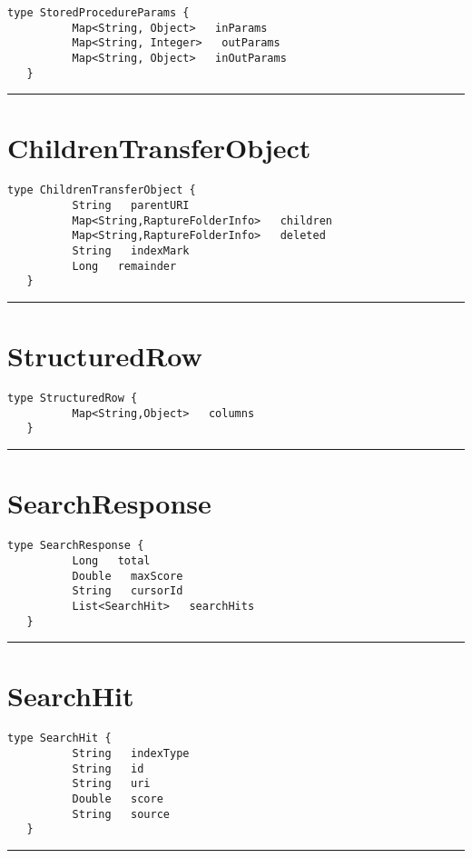 \begin{lstlisting}[style=nonumbers]
   type StoredProcedureParams {
          Map<String, Object>   inParams
          Map<String, Integer>   outParams
          Map<String, Object>   inOutParams
   }
\end{lstlisting}

\rule{12cm}{2pt}
\section{ChildrenTransferObject}
\label{type:ChildrenTransferObject}

\begin{lstlisting}[style=nonumbers]
   type ChildrenTransferObject {
          String   parentURI
          Map<String,RaptureFolderInfo>   children
          Map<String,RaptureFolderInfo>   deleted
          String   indexMark
          Long   remainder
   }
\end{lstlisting}

\rule{12cm}{2pt}
\section{StructuredRow}
\label{type:StructuredRow}

\begin{lstlisting}[style=nonumbers]
   type StructuredRow {
          Map<String,Object>   columns
   }
\end{lstlisting}

\rule{12cm}{2pt}
\section{SearchResponse}
\label{type:SearchResponse}

\begin{lstlisting}[style=nonumbers]
   type SearchResponse {
          Long   total
          Double   maxScore
          String   cursorId
          List<SearchHit>   searchHits
   }
\end{lstlisting}

\rule{12cm}{2pt}
\section{SearchHit}
\label{type:SearchHit}

\begin{lstlisting}[style=nonumbers]
   type SearchHit {
          String   indexType
          String   id
          String   uri
          Double   score
          String   source
   }
\end{lstlisting}

\rule{12cm}{2pt}

